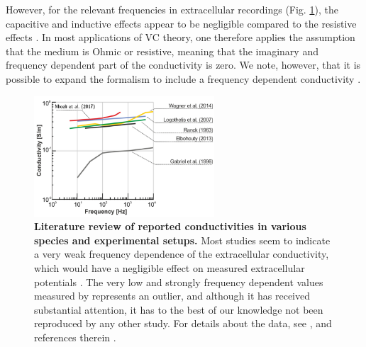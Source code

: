 However, for the relevant frequencies in extracellular recordings (Fig. \ref{Sigma:fig:freq_dep}), the capacitive and inductive effects appear to be negligible compared to the resistive effects \citep{Logothetis2007, Miceli2017, Ranta2017}. In most applications of VC theory, one therefore applies the assumption that the medium is Ohmic or resistive, meaning that the imaginary and frequency dependent part of the conductivity is zero. We note, however, that it is possible to expand the formalism to include a frequency dependent conductivity \citep{Bedard2004, Tracey2011, Miceli2017}. 

\begin{figure}[!ht]
\begin{center}
\includegraphics[width=0.6\textwidth]{Figures/Sigma/frequency_dependence.png}
\end{center}
\caption{\textbf{Literature review of reported conductivities in various species and experimental setups.} 
Most studies seem to indicate a very weak frequency dependence of the extracellular conductivity, which would have a negligible effect on measured extracellular potentials \citep{Miceli2017}. The very low and strongly frequency dependent values measured by \citep{Gabriel1996} represents an outlier, and although it has received substantial attention, it has to the best of our knowledge not been reproduced by any other study. For details about the data, see \citep{Miceli2017}, and references therein \citep{Ranck1963, Gabriel1996, Logothetis2007, Elbohouty2013, Wagner2014}.
}
\label{Sigma:fig:freq_dep}
\end{figure}



